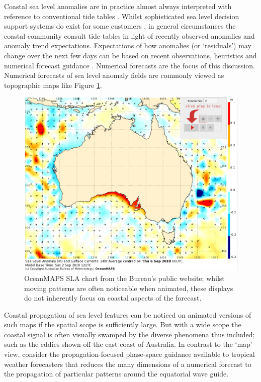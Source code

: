 Coastal sea level anomalies are in practice almost always interpreted with reference to conventional tide tables \citep{PCTMSL-sp9}.
Whilst sophisticated sea level decision support systems do exist for some customers \citep{James:2017gj}, in general circumstances the coastal community consult tide tables in light of recently observed anomalies and anomaly trend expectations.
Expectations of how anomalies (or `residuals') may change over the next few days can be based on recent observations, heuristics and numerical forecast guidance \citep{Taylor:2017co, Horsburgh:2011th}.   Numerical forecasts are the focus of this discussion.
Numerical forecasts of sea level anomaly fields are commonly viewed as topographic maps like Figure \ref{fig:oldcharts}.
\begin{figure}[H]\centering
    \includegraphics[width=\figwidthBig]{figures/maps/omaps_chart_anim_eg.png}
    \caption[OceanMAPS SLA chart from the Bureau's public website]{ OceanMAPS SLA chart from the Bureau's public website;
              whilst moving patterns are often noticeable when animated, these displays do not inherently focus on coastal aspects of the forecast.  \protect\citep{urlBOM_SLA:2018} }
    \label{fig:oldcharts}
\end{figure}  
Coastal propagation of sea level features can be noticed on animated versions of such maps if the spatial scope is sufficiently large.
But with a wide scope the coastal signal is often visually swamped by the diverse phenomena thus included; such as the eddies shown off the east coast of Australia.
In contrast to the `map' view, consider the propagation-focused phase-space guidance available to tropical weather forecasters \citep{Wheeler:2001} that reduces the many dimensions of a numerical forecast to the propagation of particular patterns around the equatorial wave guide.

